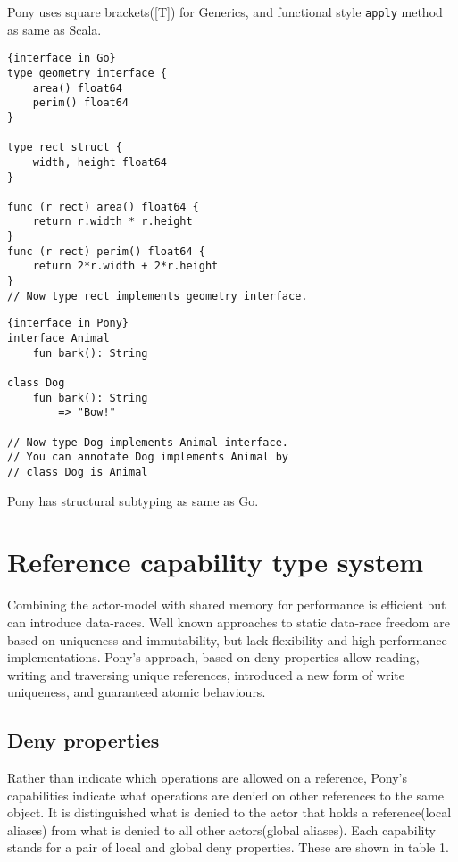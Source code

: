 \documentclass{article}
\begin{document}
Pony uses square brackets([T]) for Generics, and functional style \texttt{apply} method as same as Scala\cite{scala}. \\


\begin{lstlisting}{interface in Go}
type geometry interface {
    area() float64
    perim() float64
}

type rect struct {
    width, height float64
}

func (r rect) area() float64 {
    return r.width * r.height
}
func (r rect) perim() float64 {
    return 2*r.width + 2*r.height
}
// Now type rect implements geometry interface.

\end{lstlisting}

\begin{lstlisting}{interface in Pony}
interface Animal
	fun bark(): String
	
class Dog
	fun bark(): String
		=> "Bow!"	
	
// Now type Dog implements Animal interface.
// You can annotate Dog implements Animal by 
// class Dog is Animal
\end{lstlisting}
 
Pony has structural subtyping as same as Go\cite{go}.

\section{Reference capability type system}
Combining the actor-model with shared memory for performance is efficient but can introduce data-races. Well known approaches to static data-race freedom are based on uniqueness and immutability, but lack flexibility and high performance implementations. Pony's approach, based on deny properties allow reading, writing and traversing unique references, introduced a new form of write uniqueness, and guaranteed atomic behaviours.

\subsection{Deny properties}
Rather than indicate which operations are allowed on a reference, Pony's capabilities indicate what operations are denied on other references to the same object. It is distinguished what is denied to the actor that holds a reference(local aliases) from what is denied to all other actors(global aliases). Each capability stands for a pair of local and global deny properties.
These are shown in table 1.
\end{document}

